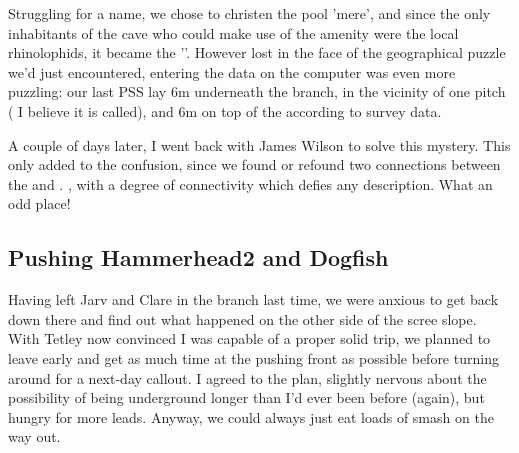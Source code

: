 	Struggling for a name, we chose to christen the pool 'mere', and since the only inhabitants of the cave who could make use of the amenity were the local rhinolophids, it became the ''. However lost in the face of the geographical puzzle we'd just encountered, entering the data on the computer was even more puzzling: our last PSS lay 6m underneath the  branch, in the vicinity of one pitch ( I believe it is called), and 6m on top of the  according to survey data.
	
	A couple of days later, I went back with James Wilson to solve this mystery. This only added to the confusion, since we found or refound two connections between the  and . , with a degree of connectivity which defies any description. What an odd place!


\subsection{Pushing Hammerhead2 and Dogfish}

\begin{marginfigure}
\end{marginfigure}

Having left Jarv and Clare in the  branch last time, we were anxious to get back down there and find out what happened on the other side of the scree slope. With Tetley now convinced I was capable of a proper solid trip, we planned to leave early and get as much time at the pushing front as possible before turning around for a next-day callout. I agreed to the plan, slightly nervous about the possibility of being underground longer than I’d ever been before (again), but hungry for more leads. Anyway, we could always just eat loads of smash on the way out.

